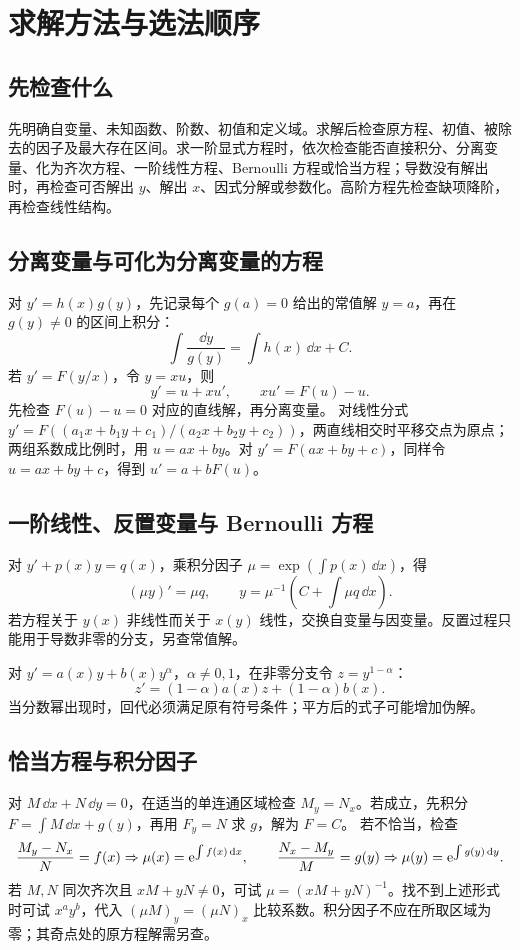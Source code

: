 \section{求解方法与选法顺序}
\subsection{先检查什么}
先明确自变量、未知函数、阶数、初值和定义域。求解后检查原方程、初值、被除去的因子及最大存在区间。求一阶显式方程时，依次检查能否直接积分、分离变量、化为齐次方程、一阶线性方程、Bernoulli 方程或恰当方程；导数没有解出时，再检查可否解出 $y$、解出 $x$、因式分解或参数化。高阶方程先检查缺项降阶，再检查线性结构。
\subsection{分离变量与可化为分离变量的方程}
对 $y'=h(x)g(y)$，先记录每个 $g(a)=0$ 给出的常值解 $y=a$，再在 $g(y)\ne0$ 的区间上积分：
\[
 \int\dfrac{\dd y}{g(y)}=\int h(x)\,\dd x+C.
\]
若 $y'=F(y/x)$，令 $y=xu$，则
\[
 y'=u+xu',\qquad xu'=F(u)-u.
\]
先检查 $F(u)-u=0$ 对应的直线解，再分离变量。
对线性分式 $y'=F((a_1x+b_1y+c_1)/(a_2x+b_2y+c_2))$，两直线相交时平移交点为原点；两组系数成比例时，用 $u=ax+by$。对 $y'=F(ax+by+c)$，同样令 $u=ax+by+c$，得到 $u'=a+bF(u)$。
\subsection{一阶线性、反置变量与 Bernoulli 方程}
对 $y'+p(x)y=q(x)$，乘积分因子 $\mu=\exp(\displaystyle\int p(x)\,\dd x)$，得
\[
 (\mu y)'=\mu q,\qquad y=\mu^{-1}\left(C+\int\mu q\,\dd x\right).
\]
若方程关于 $y(x)$ 非线性而关于 $x(y)$ 线性，交换自变量与因变量。反置过程只能用于导数非零的分支，另查常值解。

对 $y'=a(x)y+b(x)y^\alpha$，$\alpha\ne0,1$，在非零分支令 $z=y^{1-\alpha}$：
\[
 z'=(1-\alpha)a(x)z+(1-\alpha)b(x).
\]
当分数幂出现时，回代必须满足原有符号条件；平方后的式子可能增加伪解。
\subsection{恰当方程与积分因子}
对 $M\,\dd x+N\,\dd y=0$，在适当的单连通区域检查 $M_y=N_x$。若成立，先积分 $F=\displaystyle\int M\,\dd x+g(y)$，再用 $F_y=N$ 求 $g$，解为 $F=C$。
若不恰当，检查
\[
 \dfrac{M_y-N_x}{N}=f(x)\Rightarrow\mu(x)=\mathrm e^{\int f(x)\,\mathrm d x},\qquad
 \dfrac{N_x-M_y}{M}=g(y)\Rightarrow\mu(y)=\mathrm e^{\int g(y)\,\mathrm d y}.
\]
若 $M,N$ 同次齐次且 $xM+yN\ne0$，可试 $\mu=(xM+yN)^{-1}$。找不到上述形式时可试 $x^ay^b$，代入 $(\mu M)_y=(\mu N)_x$ 比较系数。积分因子不应在所取区域为零；其奇点处的原方程解需另查。
